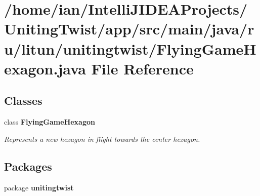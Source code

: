\section{/home/ian/\+Intelli\+J\+I\+D\+E\+A\+Projects/\+Uniting\+Twist/app/src/main/java/ru/litun/unitingtwist/\+Flying\+Game\+Hexagon.java File Reference}
\label{_flying_game_hexagon_8java}
\subsection*{Classes}
\begin{DoxyCompactItemize}
\item 
class \textbf{ Flying\+Game\+Hexagon}
\begin{DoxyCompactList}\small\item\em Represents a new hexagon in flight towards the center hexagon. \end{DoxyCompactList}\end{DoxyCompactItemize}
\subsection*{Packages}
\begin{DoxyCompactItemize}
\item 
package \textbf{ unitingtwist}
\end{DoxyCompactItemize}
